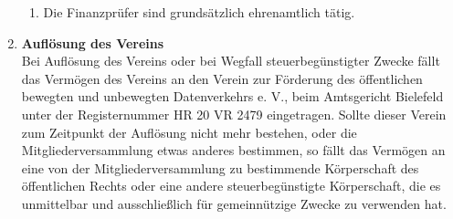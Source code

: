 \begin{enumerate}[label=\bfseries §\arabic*]
\begin{enumerate}[label=\bfseries (\arabic*)]
      \item Die Finanzprüfer sind grundsätzlich ehrenamtlich tätig.
    \end{enumerate}
  \item \textbf{Auflösung des Vereins}\\
    Bei Auflösung des Vereins oder bei Wegfall steuerbegünstigter Zwecke fällt das Vermögen des Vereins an den Verein zur Förderung des öffentlichen bewegten und unbewegten Datenverkehrs e. V., beim Amtsgericht Bielefeld unter der Registernummer HR 20 VR 2479 eingetragen. Sollte dieser Verein zum Zeitpunkt der Auflösung nicht mehr bestehen, oder die Mitgliederversammlung etwas anderes bestimmen, so fällt das Vermögen an eine von der Mitgliederversammlung zu bestimmende Körperschaft des öffentlichen Rechts oder eine andere steuerbegünstigte Körperschaft, die es unmittelbar und ausschließlich für gemeinnützige Zwecke zu verwenden hat.
\end{enumerate}

